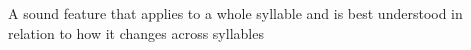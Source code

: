 A sound feature that applies to a whole syllable and is best understood in relation to how it changes across syllables
